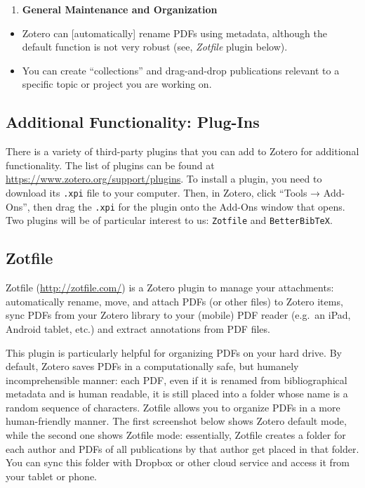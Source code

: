\documentclass[
]{book}
\providecommand{\tightlist}{%
  \setlength{\itemsep}{0pt}\setlength{\parskip}{0pt}}
\begin{document}
\begin{enumerate}
\def\labelenumi{\arabic{enumi}.}
\setcounter{enumi}{2}
\tightlist
\item
  \textbf{General Maintenance and Organization}
\end{enumerate}

\begin{itemize}
\tightlist
\item
  Zotero can {[}automatically{]} rename PDFs using metadata, although the default function is not very robust (see, \emph{Zotfile} plugin below).
\item
  You can create ``collections'' and drag-and-drop publications relevant to a specific topic or project you are working on.
\end{itemize}

\hypertarget{additional-functionality-plug-ins}{%
\subsection{Additional Functionality: Plug-Ins}\label{additional-functionality-plug-ins}}

There is a variety of third-party plugins that you can add to Zotero for additional functionality. The list of plugins can be found at \url{https://www.zotero.org/support/plugins}. To install a plugin, you need to download its \texttt{.xpi} file to your computer. Then, in Zotero, click ``Tools → Add-Ons'', then drag the \texttt{.xpi} for the plugin onto the Add-Ons window that opens. Two plugins will be of particular interest to us: \texttt{Zotfile} and \texttt{BetterBibTeX}.

\hypertarget{zotfile}{%
\subsection{Zotfile}\label{zotfile}}

Zotfile (\url{http://zotfile.com/}) is a Zotero plugin to manage your attachments: automatically rename, move, and attach PDFs (or other files) to Zotero items, sync PDFs from your Zotero library to your (mobile) PDF reader (e.g.~an iPad, Android tablet, etc.) and extract annotations from PDF files.

This plugin is particularly helpful for organizing PDFs on your hard drive. By default, Zotero saves PDFs in a computationally safe, but humanely incomprehensible manner: each PDF, even if it is renamed from bibliographical metadata and is human readable, it is still placed into a folder whose name is a random sequence of characters. Zotfile allows you to organize PDFs in a more human-friendly manner. The first screenshot below shows Zotero default mode, while the second one shows Zotfile mode: essentially, Zotfile creates a folder for each author and PDFs of all publications by that author get placed in that folder. You can sync this folder with Dropbox or other cloud service and access it from your tablet or phone.
\end{document}
